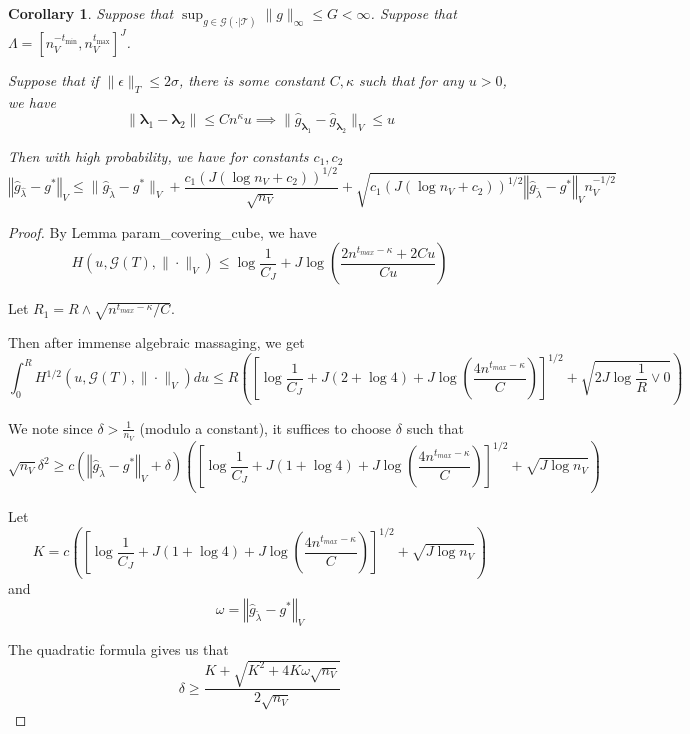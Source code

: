 \documentclass[12pt]{article}
\newtheorem{corollary}{Corollary}
\begin{document}
\begin{corollary}
\label{train_val_corr}
Suppose that $\sup_{g \in \mathcal{G(\cdot | T)}} \| g \|_\infty \le G < \infty$.
Suppose that $\Lambda = [ n_V^{-t_{\min}}, n_V^{t_{\max}} ]^J $.

Suppose that if $\| \epsilon \|_T \le 2 \sigma $, there is some constant $C, \kappa$ such that for any $u> 0$, we have
\begin{equation}
\| \boldsymbol \lambda_1 - \boldsymbol \lambda_2 \| \le C n^\kappa u \implies \| \hat{g}_{\boldsymbol \lambda_1} - \hat{g}_{\boldsymbol \lambda_2} \|_V \le u
\end{equation}

Then with high probability, we have for constants $c_1, c_2$
\begin{equation}
\label{error_bound}
\left\Vert \hat{g}_{\hat{\lambda}}-g^{*}\right\Vert _{V} \le
\|\hat{g}_{\tilde{\lambda}}-g^{*}\|_{V}
+\frac{c_{1}\left(J(\log n_{V}+c_{2})\right)^{1/2}}{\sqrt{n_{V}}}
+\sqrt{c_1 \left(J(\log n_{V}+c_{2})\right)^{1/2}\left\Vert \hat{g}_{\tilde{\lambda}}-g^{*}\right\Vert _{V}n_{V}^{-1/2}}
\end{equation}
\end{corollary}

\begin{proof}
By Lemma param\_covering\_cube, we have
\[
H(u,\mathcal{G}(T),\|\cdot\|_{V})\le\log\frac{1}{C_{J}}+J\log\left(\frac{2n^{t_{max}-\kappa}+2Cu}{Cu}\right)
\]


Let $R_{1}=R\wedge\sqrt{n^{t_{max}-\kappa}/C}$.

Then after immense algebraic massaging, we get
\begin{equation}
\int_{0}^{R}H{}^{1/2}(u,\mathcal{G}(T),\|\cdot\|_{V})du
\le
R\left(\left[\log\frac{1}{C_{J}}+J(2+\log4)+J\log\left(\frac{4n^{t_{max}-\kappa}}{C}\right)\right]^{1/2}+\sqrt{2J\log\frac{1}{R}\vee0}\right)
\end{equation}

We note since $\delta > \frac{1}{n_{V}}$ (modulo a constant), it suffices to choose $\delta$ such that
\[
\sqrt{n_{V}}\delta^{2}\ge c\left(\left\Vert \hat{g}_{\tilde{\lambda}}-g^{*}\right\Vert _{V}+\delta\right)\left(\left[\log\frac{1}{C_{J}}+J(1+\log4)+J\log\left(\frac{4n^{t_{max}-\kappa}}{C}\right)\right]^{1/2}+\sqrt{J\log n_{V}}\right)
\]

Let 
\[
K=c\left(\left[\log\frac{1}{C_{J}}+J(1+\log4)+J\log\left(\frac{4n^{t_{max}-\kappa}}{C}\right)\right]^{1/2}+\sqrt{J\log n_{V}}\right)
\]
and 
\[
\omega=\left\Vert \hat{g}_{\tilde{\lambda}}-g^{*}\right\Vert _{V}
\]

The quadratic formula gives us that
\[
\delta\ge\frac{K+\sqrt{K^{2}+4K\omega\sqrt{n_{V}}}}{2\sqrt{n_{V}}}
\]
\end{proof}
\end{document}
